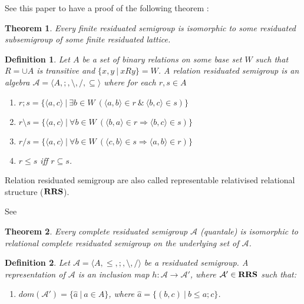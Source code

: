 \documentclass[a4paper]{article}
\theoremstyle{defin}
\newtheorem{defin}{Definition}
\theoremstyle{theorem}
\newtheorem{theorem}{Theorem}
\theoremstyle{prop}
\theoremstyle{lemma}
\theoremstyle{ex}
\theoremstyle{col}
\begin{document}
See this paper to have a proof of the following theorem \cite{goldblatt2006kripke}:

\begin{theorem}
  Every finite residuated semigroup is isomorphic to some residuated subsemigroup of some finite residuated lattice.
\end{theorem}


\begin{defin} \label{rrs}
  Let $A$ be a set of binary relations on some base set $W$ such that $R = \cup A$ is transitive and $\{ x, y \: | \: x R y \} = W$. A relation residuated semigroup is an algebra $\mathcal{A} = \langle A, ;, \setminus, /, \subseteq \rangle$ where for each $r, s \in A$
  \begin{enumerate}
    \item $r ; s = \{ \langle a, c \rangle \: | \: \exists b \in W \: (\langle a, b \rangle \in r \: \& \: \langle b, c \rangle \in s) \}$
    \item $r \setminus s = \{ \langle a, c \rangle \: | \: \forall b \in W \: (\langle b, a \rangle \in r \Rightarrow \langle b, c \rangle \in s)\}$
    \item $r / s = \{ \langle a, c \rangle \: | \: \forall b \in W \: (\langle c, b \rangle \in s \Rightarrow \langle a, b \rangle \in r)\}$
    \item $r \leq s$ iff $r \subseteq s$.
  \end{enumerate}
\end{defin}
Relation residuated semigroup are also called representable relativised relational structure (${\bf RRS}$).

See \cite{brown1993representation}
\begin{theorem}
  Every complete residuated semigroup $\mathcal{A}$ (quantale) is isomorphic to relational complete residuated semigroup on the underlying set of $\mathcal{A}$.
\end{theorem}

\begin{defin}
  Let $\mathcal{A} = \langle A, \leq, ;, \setminus, / \rangle$ be a residuated semigroup. A representation of $\mathcal{A}$ is an inclusion map $h : \mathcal{A} \to \mathcal{A}'$,
  where $\mathcal{A}' \in {\bf RRS}$ such that:
  \begin{enumerate}
    \item $dom(\mathcal{A}') = \{ \hat{a} \: | \: a \in A\}$, where $\hat{a} = \{ (b, c) \: | \: b \leq a ; c \}$.
  \end{enumerate}
\end{defin}
\end{document}
